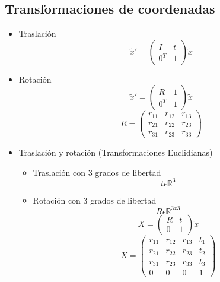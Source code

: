 \documentclass[main.tex]{subfiles}
\begin{document}
\subsection{Transformaciones de coordenadas}
\begin{itemize}
\item Traslación
  \begin{equation}
    {\tilde{x}}'= \begin{pmatrix}
                    I & t \\
                    0^{T} & 1 \end{pmatrix} \tilde{x}
  \end{equation}
  
\item Rotación
  \begin{equation}
    {\tilde{x}}' = \begin{pmatrix}
                     R &1 \\
                     0^{T} &1
                   \end{pmatrix}\tilde{x}  
  \end{equation}
  \begin{equation}
    R = \begin{pmatrix}
          r_{11} & r_{12}  &r_{13} \\ 
          r_{21} & r_{22}  &r_{23} \\ 
          r_{31} & r_{23}  &r_{33}
        \end{pmatrix}
  \end{equation}

\item Traslación y rotación (Transformaciones Euclidianas)
  \begin{itemize}
  \item Traslación con 3 grados de libertad
    \begin{equation}
      t \epsilon \mathbb{R}^{3}
    \end{equation}
  \item Rotación con 3 grados de libertad
    \begin{equation}
      R\epsilon \mathbb{R}^{3x3}
    \end{equation}
    \begin{equation}
      X = \begin{pmatrix}
            R & t \\
            0 & 1 \end{pmatrix} \tilde{x}
    \end{equation}
    \begin{equation}
      X = \begin{pmatrix}
            r_{11} & r_{12}  & r_{13} & t_{1}\\ 
            r_{21} & r_{22}  & r_{23} & t_{2}\\ 
            r_{31} & r_{23}  & r_{33} & t_{3}\\
            0      & 0       & 0      & 1
          \end{pmatrix}
    \end{equation}
  \end{itemize}
\end{itemize}
\end{document}
